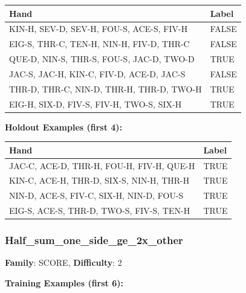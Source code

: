 \documentclass[10pt,a4paper]{article}
\begin{document}
\begin{small}
\begin{tabular}{p{8cm}l}
\toprule
Hand & Label \\
\midrule
KIN-H, SEV-D, SEV-H, FOU-S, ACE-S, FIV-H & \textcolor{negative}{FALSE} \\
EIG-S, THR-C, TEN-H, NIN-H, FIV-D, THR-C & \textcolor{negative}{FALSE} \\
QUE-D, NIN-S, THR-S, FOU-S, JAC-D, TWO-D & \textcolor{positive}{TRUE} \\
JAC-S, JAC-H, KIN-C, FIV-D, ACE-D, JAC-S & \textcolor{negative}{FALSE} \\
THR-D, THR-C, NIN-D, THR-H, THR-D, TWO-H & \textcolor{positive}{TRUE} \\
EIG-H, SIX-D, FIV-S, FIV-H, TWO-S, SIX-H & \textcolor{positive}{TRUE} \\
\bottomrule
\end{tabular}
\end{small}

\textbf{Holdout Examples (first 4):}

\begin{small}
\begin{tabular}{p{8cm}l}
\toprule
Hand & Label \\
\midrule
JAC-C, ACE-D, THR-H, FOU-H, FIV-H, QUE-H & \textcolor{positive}{TRUE} \\
KIN-C, ACE-H, THR-D, SIX-S, NIN-H, THR-H & \textcolor{positive}{TRUE} \\
NIN-D, ACE-S, FIV-C, SIX-H, NIN-D, FOU-S & \textcolor{positive}{TRUE} \\
EIG-S, ACE-S, THR-D, TWO-S, FIV-S, TEN-H & \textcolor{positive}{TRUE} \\
\bottomrule
\end{tabular}
\end{small}

\vspace{0.5cm}

\subsubsection{Half\_sum\_one\_side\_ge\_2x\_other}

\textbf{Family}: SCORE, \textbf{Difficulty}: 2

\textbf{Training Examples (first 6):}
\end{document}
